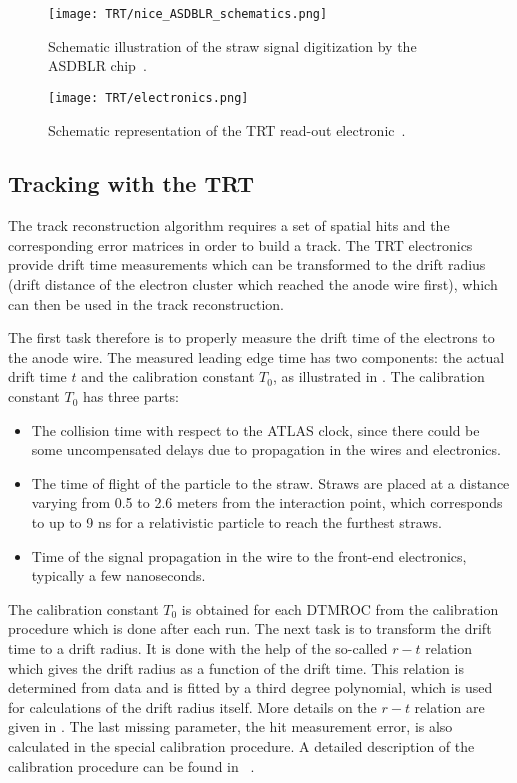 \begin{figure}[h]
\centering
\texttt{[image: TRT/nice\_ASDBLR\_schematics.png]}
\caption{ 
 Schematic illustration of the straw signal digitization by the ASDBLR chip~\cite{Aad:2008zzm}.
}
\label{fig:nice_asdblr_schematics}
\end{figure}


\begin{figure}[h]
\centering
\texttt{[image: TRT/electronics.png]}
\caption{ 
 Schematic representation of the TRT read-out electronic~\cite{TRT_electronics}.
}
\label{fig:electronics}
\end{figure}



\subsection{Tracking with the TRT}
\label{subsec:tracking_with_trt}

The track reconstruction algorithm requires a set of spatial hits and the corresponding error matrices in order to build a track. The TRT electronics provide drift time measurements which can be transformed to the
drift radius (drift distance of the electron cluster which reached the anode wire first), which can then be used in the track reconstruction.

The first task therefore is to properly measure the drift time of the electrons to the anode wire. 
The measured leading edge time has two components: the actual drift time $t$ and the calibration constant $T_{0}$, as illustrated in .
The calibration constant $T_{0}$ has three parts:
\begin{itemize}
 \item The collision time with respect to the ATLAS clock, since there could be some uncompensated delays due to propagation in the wires and electronics.
 \item The time of flight of the particle to the straw. Straws are placed at a distance varying from 0.5 to 2.6 meters from the interaction point, 
 which corresponds to up to 9 ns for a relativistic particle to reach the furthest straws.
 \item Time of the signal propagation in the wire to the front-end electronics, typically a few nanoseconds.
\end{itemize}
The calibration constant $T_{0}$ is obtained for each DTMROC from the calibration procedure which is done after each run.
The next task is to transform the drift time to a drift radius. It is done with the help of the so-called $r-t$ relation which gives the drift radius as a function of the drift time.
This relation is determined from data and is fitted by a third degree polynomial, which is used for calculations of the drift radius itself.
More details on the $r-t$ relation are given in .
The last missing parameter, the hit measurement error, is also calculated in the special calibration procedure. A detailed description of the calibration procedure
can be found in ~\cite{alonso_thesis}.

